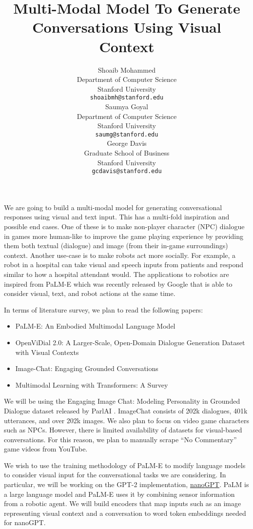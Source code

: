 \documentclass{article}
\title{
  Multi-Modal Model To Generate Conversations Using Visual Context \\
  \vspace{1em}
}
\author{
  Shoaib Mohammed \\
  Department of Computer Science \\
  Stanford University \\
  \texttt{shoaibmh@stanford.edu} \\
  \And
  Saumya Goyal \\
  Department of Computer Science \\
  Stanford University \\
  \texttt{saumg@stanford.edu} \\
  \And
  George Davis \\
  Graduate School of Business \\
  Stanford University \\
  \texttt{gcdavis@stanford.edu} \\
}
\begin{document}
\maketitle

We are going to build a multi-modal model for generating conversational responses using visual and text input. This has a multi-fold inspiration and possible end cases. One of these is to make non-player character (NPC) dialogue in games more human-like to improve the game playing experience by providing them both textual (dialogue) and image (from their in-game surroundings) context. Another use-case is to make robots act more socially. For example, a robot in a hospital can take visual and speech inputs from patients and respond similar to how a hospital attendant would. The applications to robotics are inspired from PaLM-E which was recently released by Google that is able to consider visual, text, and robot actions at the same time. 

In terms of literature survey, we plan to read the following papers:
\begin{itemize}
    \itemsep-0.2em
    \item PaLM-E: An Embodied Multimodal Language Model 
    \cite{driess2023palme}
    \item OpenViDial 2.0: A Larger-Scale, Open-Domain Dialogue Generation Dataset with Visual Contexts \cite{wang2021openvidial}
    \item Image-Chat: Engaging Grounded Conversations \cite{shuster2020image}
    \item Multimodal Learning with Transformers: A Survey \cite{xu2022multimodal}
\end{itemize}

We will be using the Engaging Image Chat: Modeling Personality in Grounded Dialogue dataset released by ParlAI \cite{shuster2020image}. ImageChat consists of 202k dialogues, 401k utterances, and over 202k images. We also plan to focus on video game characters such as NPCs. However, there is limited availability of datasets for visual-based conversations. For this reason, we plan to manually scrape “No Commentary” game videos from YouTube.

We wish to use the training methodology of PaLM-E to modify language models to consider visual input for the conversational tasks we are considering. In particular, we will be working on the GPT-2 implementation, \href{https://github.com/karpathy/nanoGPT}{nanoGPT}. PaLM \cite{chowdhery2022palm} is a large language model and PaLM-E uses it by combining sensor information from a robotic agent. We will build encoders that map inputs such as an image representing visual context and a conversation to word token embeddings needed for nanoGPT.
\end{document}
